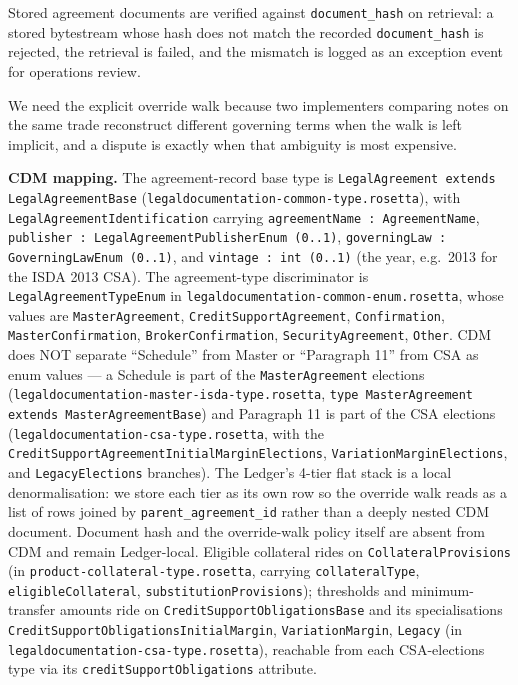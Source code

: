 \documentclass[11pt,a4paper]{article}
\begin{document}
Stored agreement documents are verified against \texttt{document\_hash} on retrieval: a stored bytestream whose hash does not match the recorded \texttt{document\_hash} is rejected, the retrieval is failed, and the mismatch is logged as an exception event for operations review.

We need the explicit override walk because two implementers comparing notes on the same trade reconstruct different governing terms when the walk is left implicit, and a dispute is exactly when that ambiguity is most expensive.

\textbf{CDM mapping.} The agreement-record base type is \texttt{LegalAgreement extends LegalAgreementBase} (\texttt{legaldocumentation-common-type.rosetta}), with \texttt{LegalAgreementIdentification} carrying \texttt{agreementName : AgreementName}, \texttt{publisher : LegalAgreementPublisherEnum (0..1)}, \texttt{governingLaw : GoverningLawEnum (0..1)}, and \texttt{vintage : int (0..1)} (the year, e.g.\ 2013 for the ISDA 2013 CSA). The agreement-type discriminator is \texttt{LegalAgreementTypeEnum} in \texttt{legaldocumentation-common-enum.rosetta}, whose values are \texttt{MasterAgreement}, \texttt{CreditSupportAgreement}, \texttt{Confirmation}, \texttt{MasterConfirmation}, \texttt{BrokerConfirmation}, \texttt{SecurityAgreement}, \texttt{Other}. CDM does NOT separate ``Schedule'' from Master or ``Paragraph 11'' from CSA as enum values --- a Schedule is part of the \texttt{MasterAgreement} elections (\texttt{legaldocumentation-master-isda-type.rosetta}, \texttt{type MasterAgreement extends MasterAgreementBase}) and Paragraph 11 is part of the CSA elections (\texttt{legaldocumentation-csa-type.rosetta}, with the \texttt{CreditSupportAgreement\-Initial\-Margin\-Elections}, \texttt{Variation\-Margin\-Elections}, and \texttt{Legacy\-Elections} branches). The Ledger's 4-tier flat stack is a local denormalisation: we store each tier as its own row so the override walk reads as a list of rows joined by \texttt{parent\_agreement\_id} rather than a deeply nested CDM document. Document hash and the override-walk policy itself are absent from CDM and remain Ledger-local. Eligible collateral rides on \texttt{CollateralProvisions} (in \texttt{product-collateral-type.rosetta}, carrying \texttt{collateralType}, \texttt{eligibleCollateral}, \texttt{substitutionProvisions}); thresholds and minimum-transfer amounts ride on \texttt{CreditSupportObligationsBase} and its specialisations \texttt{CreditSupportObligationsInitialMargin}, \texttt{VariationMargin}, \texttt{Legacy} (in \texttt{legaldocumentation-csa-type.rosetta}), reachable from each CSA-elections type via its \texttt{creditSupportObligations} attribute.
\end{document}

